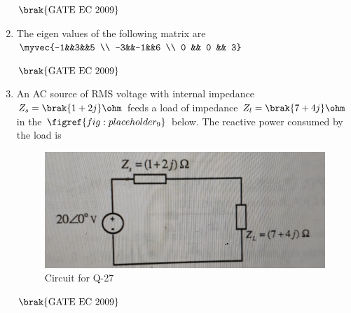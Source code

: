 \documentclass[journal,12pt,onecolumn]{IEEEtran}
\theoremstyle{remark}
\begin{document}
\begin{enumerate}
\begin{enumerate}
\end{enumerate}
\hfill $\brak{\text{GATE EC 2009}}$

\item The eigen values of the following matrix are 
$\myvec{-1&&3&&5 \\ -3&&-1&&6 \\ 0 && 0 && 3}$
\begin{enumerate}
\end{enumerate}
\hfill $\brak{\text{GATE EC 2009}}$

\item An AC source of RMS voltage with internal impedance $Z_s = \brak{1+2j} \ohm$ feeds a load of impedance $Z_l = \brak{7+4j} \ohm$ in the $\figref{fig:placeholder_9}$ below. The reactive power consumed by the load is 
\begin{figure}[H]
    \centering
    \includegraphics[width=0.5\columnwidth]{figs/fig_9.jpg}
    \caption{\centering Circuit for Q-27}
    \label{fig:placeholder_9}
\end{figure}
\begin{enumerate}
\end{enumerate}
\hfill $\brak{\text{GATE EC 2009}}$


\end{enumerate}
\end{document}
